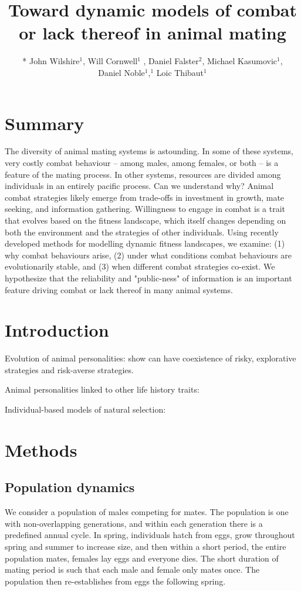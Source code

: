 \documentclass[a4paper,11pt]{article}
\title{Toward dynamic models of combat or lack thereof in animal mating}
\author{
* John Wilshire$^1$, Will Cornwell$^1$ , Daniel Falster$^2$, Michael Kasumovic$^1$, \\
Daniel Noble$^1$,$^1$ Loic Thibaut$^1$}
\affiliation{
*final list and order undecided\\
$^1$ University of NSW\\
$^2$ Macquarie University\\
}
\date{}
\begin{document}
\mstitlepage
\noindent
\linenumbers

\section{Summary}
The diversity of animal mating systems is astounding. In some of these
systems, very costly combat behaviour -- among males, among females, or
both -- is a feature of the mating process.  In other systems, resources
are divided among individuals in an entirely pacific process.  Can we
understand why? Animal combat strategies likely emerge from trade-offs
in investment in growth, mate seeking, and information gathering.
Willingness to engage in combat is a trait that evolves based on the
fitness landscape, which itself changes depending on both the
environment and the strategies of other individuals.  Using recently
developed methods for modelling dynamic fitness landscapes, we examine:
(1) why combat behaviours arise, (2) under what conditions combat
behaviours are evolutionarily stable, and (3) when different combat
strategies co-exist.  We hypothesize that the reliability and
"public-ness" of information is an important feature driving combat or
lack thereof in many animal systems.

\section{Introduction}

Evolution of animal personalities: \citep{Wolf-2007,Wolf-2012} show can have
coexistence of risky, explorative strategies and risk-averse strategies.

Animal personalities linked to other life history traits: \citep{Biro-2008}

Individual-based models of natural selection: \citep{MGonigle-2012}


\section{Methods}

\subsection{Population dynamics}


We consider a population of males competing for mates. The population is one with non-overlapping generations, and within each generation there is a predefined annual cycle. In spring, individuals hatch from eggs, grow throughout spring and summer to increase size, and then within a short period, the entire population mates, females lay eggs and everyone dies. The short duration of mating period is such that each male and female only mates once. The population then re-establishes from eggs the following spring.
\end{document}
